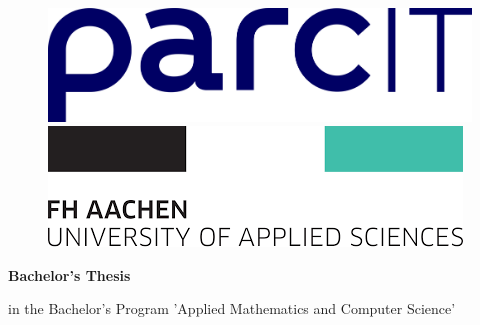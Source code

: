 \begin{titlepage}


    \begin{figure}[h]
        \centering
        \begin{minipage}{0.30\textwidth}
            \centering
            \includegraphics[width=\textwidth]{images/logo/parcit-logo.png}
        \end{minipage}
        \hspace{0.25\textwidth}
        \begin{minipage}{0.30\textwidth}
            \centering
            \includegraphics[width=\textwidth]{images/logo/fh-aachen-logo.png}
        \end{minipage}
    \end{figure}

    \vspace{2cm}

    \begin{minipage}{0.9\textwidth}
        \fontsize{20pt}{16pt}\selectfont
        \begin{center}
            \textbf{Bachelor's Thesis}
        \end{center}
    \end{minipage}

    \vspace{0.5cm}

    \begin{minipage}{0.9\textwidth}
        \fontsize{14pt}{16pt}\selectfont
        \begin{center}
            in the Bachelor's Program 'Applied Mathematics and Computer Science'
        \end{center}
    \end{minipage}


\end{titlepage}
